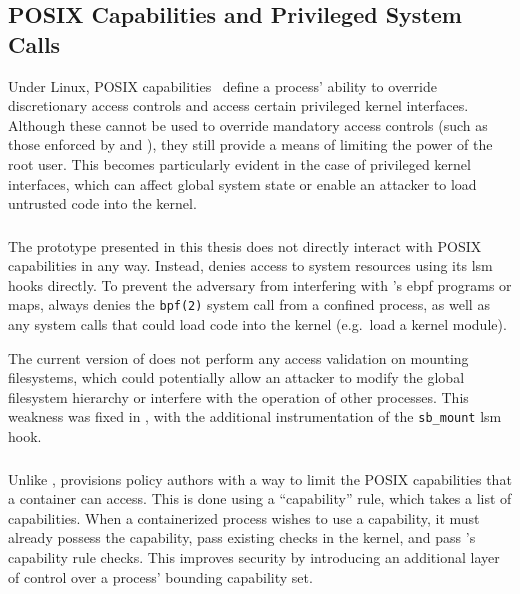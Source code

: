 \subsection{POSIX Capabilities and Privileged System Calls}

Under Linux, POSIX capabilities~\cite{posix_capabilities} define a process' ability to
override discretionary access controls and access certain privileged kernel interfaces.
Although these cannot be used to override mandatory access controls (such as those
enforced by \bpfbox{} and \bpfcontain{}), they still provide a means of limiting the power
of the root user. This becomes particularly evident in the case of privileged kernel
interfaces, which can affect global system state or enable an attacker to load untrusted
code into the kernel.

\subsubsection{\bpfbox{}}

The \bpfbox{} prototype presented in this thesis does not directly interact with POSIX
capabilities in any way. Instead, \bpfbox{} denies access to system resources using its
\gls{lsm} hooks directly. To prevent the adversary from interfering with \bpfbox{}'s
\gls{ebpf} programs or maps, \bpfbox{} always denies the \texttt{bpf(2)} system call from
a confined process, as well as any system calls that could load code into the kernel
(e.g.~load a kernel module).

The current version of \bpfbox{} does not perform any access validation on mounting
filesystems, which could potentially allow an attacker to modify the global filesystem
hierarchy or interfere with the operation of other processes. This weakness was fixed in
\bpfcontain{}, with the additional instrumentation of the \texttt{sb\_mount} \gls{lsm}
hook.

\subsubsection{\bpfcontain{}}

Unlike \bpfbox{}, \bpfcontain{} provisions policy authors with a way to limit the POSIX
capabilities that a container can access. This is done using a \enquote{capability} rule,
which takes a list of capabilities. When a containerized process wishes to use
a capability, it must already possess the capability, pass existing checks in the kernel,
and pass \bpfcontain{}'s capability rule checks. This improves security by introducing an
additional layer of control over a process' bounding capability set.

